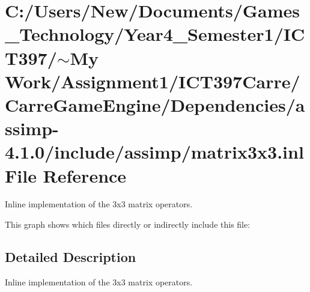 \hypertarget{matrix3x3_8inl}{
\section{C:/Users/New/Documents/Games\_\-Technology/Year4\_\-Semester1/ICT397/$\sim$My Work/Assignment1/ICT397Carre/CarreGameEngine/Dependencies/assimp-4.1.0/include/assimp/matrix3x3.inl File Reference}
\label{matrix3x3_8inl}
}
Inline implementation of the 3x3 matrix operators. 



This graph shows which files directly or indirectly include this file:

\subsection{Detailed Description}
Inline implementation of the 3x3 matrix operators. 

